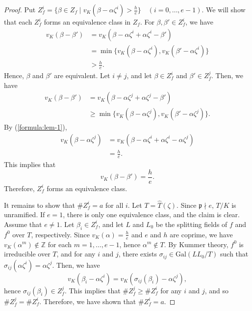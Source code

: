 \documentclass{article}
\newcommand{\field}[1]{\mathbb{#1}}
\newcommand{\Z}{\field{Z}}
\newcommand{\Gal}{\mathrm{Gal}}
\theoremstyle{definition}
\theoremstyle{remark}
\numberwithin{equation}{section}
\begin{document}
\begin{proof}
    Put $Z_f^i = \{\beta \in Z_f \mid v_K(\beta - \alpha\zeta^i) > \frac{h}{e}\} \quad (i = 0, \dots ,e - 1)$. 
    We will show that each $Z_f^i$ forms an equivalence class in $Z_f$. 
    For $\beta, \beta' \in Z_f^i$, we have 
    \begin{align}
      v_K(\beta - \beta') &= v_K(\beta - \alpha\zeta^i + \alpha\zeta^i - \beta') \\
      &= \min\{v_K(\beta - \alpha\zeta^i),v_K(\beta' - \alpha\zeta^i)\} \\
      &> \frac{h}{e}. 
    \end{align}
    Hence, $\beta$ and $\beta'$ are equivalent. 
    Let $i \ne j$, and let $\beta \in Z_f^i$ and $\beta' \in Z_f^j$. 
    Then, we have 
    \begin{align}
      v_K(\beta - \beta') &= v_K(\beta - \alpha\zeta^j + \alpha\zeta^j - \beta') \\
      &\ge \min\{v_K(\beta - \alpha\zeta^j),v_K(\beta' - \alpha\zeta^j)\}. 
    \end{align}
    By (\ref{formula:lem-1}), 
    \begin{align}
      v_K(\beta - \alpha\zeta^j) &= v_K(\beta - \alpha\zeta^i + \alpha\zeta^i - \alpha\zeta^j) \\
      &= \frac{h}{e}. 
    \end{align}
    This implies that 
    \[
      v_K(\beta - \beta') = \frac{h}{e}. 
    \]
    Therefore, $Z_f^i$ forms an equivalence class. 

    It remains to show that $\#Z^i_f = a$ for all $i$. 
    Let $T = \hat{T}(\zeta)$. Since $\mathfrak{p} \nmid e$, $T/K$ is unramified. 
    If $e = 1$, there is only one equivalence class, and the claim is clear. 
    Assume that $e \ne 1$. 
    Let $\beta_i \in Z_f^i$, and let $L$ and $L_0$ be the splitting fields of $f$ and $f^0$ over $T$, respectively. 
    Since $v_K(\alpha) = \frac{h}{e}$ and $e$ and $h$ are coprime, we have $v_K(\alpha^m) \notin \Z$ for each $m = 1, \dots ,e-1$, hence $\alpha^m \notin T$. 
    By Kummer theory, $f^0$ is irreducible over $T$, and for any $i$ and $j$, there exists $\sigma_{ij} \in \Gal(LL_0/T)$ such that $\sigma_{ij}(\alpha \zeta^i) = \alpha \zeta^j$. 
    Then, we have 
    \[
      v_K(\beta_i - \alpha\zeta^i) = v_K(\sigma_{ij}(\beta_i) - \alpha\zeta^j), 
    \]
    hence $\sigma_{ij}(\beta_i) \in Z^j_f$. This implies that $\#Z^j_f \ge \#Z^i_f$ for any $i$ and $j$, and so $\#Z^j_f = \#Z^i_f$. 
    Therefore, we have shown that $\#Z^i_f = a$. 
  \end{proof}
  
\end{document}
